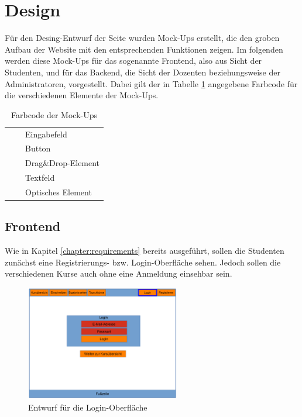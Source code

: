     \section{Design}
        Für den Desing-Entwurf der Seite wurden Mock-Ups erstellt, die den groben Aufbau der Website mit den entsprechenden Funktionen zeigen. 
        Im folgenden werden diese Mock-Ups für das sogenannte Frontend, also aus Sicht der Studenten, und für das Backend, die Sicht der Dozenten beziehungsweise der Administratoren, vorgestellt.
        Dabei gilt der in Tabelle \ref{tab:Farbcode} angegebene Farbcode für die verschiedenen Elemente der Mock-Ups.
        \begin{table}
            \centering
            \begin{tabular}{l c| l}
                \cellcolor{red} & & Eingabefeld\\
                \cellcolor{orange} & & Button\\
                \cellcolor{olive} & & Drag\&Drop-Element\\
                \cellcolor{green} & & Textfeld\\
                \cellcolor{blue} & & Optisches Element
            \end{tabular}
            \caption{Farbcode der Mock-Ups}
            \label{tab:Farbcode}
        \end{table}
    
        \subsection{Frontend}
            Wie in Kapitel \ref{chapter:requirements} bereits ausgeführt, sollen die Studenten zunächst eine Registrierungs- bzw. Login-Oberfläche sehen.
            Jedoch sollen die verschiedenen Kurse auch ohne eine Anmeldung einsehbar sein.
            \begin{figure}[t]
            	\centering
            	\includegraphics[width=0.6\textwidth]{./design/images/MockUpsFrontend/frontendLogin.png}
            	\caption{Entwurf für die Login-Oberfläche}
            	\label{fig:mockupLoginFrontend}
            \end{figure}   
        
